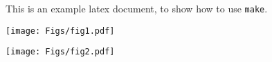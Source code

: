 \documentclass[12pt]{article}
\begin{document}
This is an example latex document, to show how to use {\tt make}.

\centerline{\texttt{[image: Figs/fig1.pdf]}}

\centerline{\texttt{[image: Figs/fig2.pdf]}}
\end{document}
